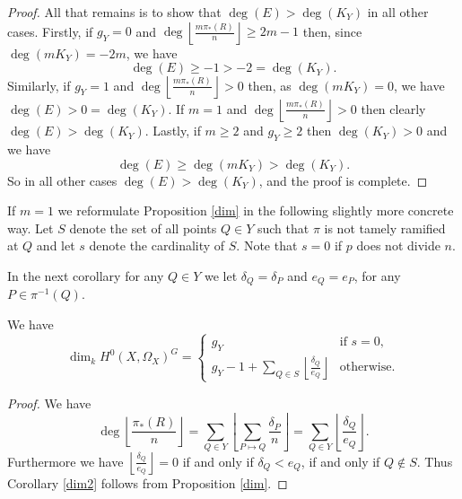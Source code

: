 \begin{proof}
    
    All that remains is to show that $\deg(E)>\deg(K_Y)$ in all other cases.
    Firstly, if $g_Y=0$ and $\deg \left\lfloor\frac{m\pi_*(R)}{n} \right\rfloor \geq 2m-1$ then, since $\deg(mK_Y)=-2m$, we have 
        \[
        \deg \left( E \right) \geq -1 >-2 = \deg(K_Y).
        \]
    Similarly, if $g_Y=1$ and $\deg \left\lfloor\frac{m\pi_*(R)}{n} \right\rfloor >0$ then, as $\deg \left( mK_Y \right)=0$, we have $\deg \left( E \right) > 0 = \deg (K_Y)$.
    If $m=1$ and $\deg \left\lfloor\frac{m\pi_*(R)}{n} \right\rfloor >0$ then clearly $\deg \left( E \right) > \deg (K_Y)$.
    Lastly, if $m\geq 2$ and $g_Y\geq 2$ then $\deg (K_Y) > 0$ and we have 
        \begin{equation*}
        \deg \left( E \right) \geq \deg\left( mK_Y \right) > \deg (K_Y).
        \end{equation*}
    So in all other cases $\deg(E)>\deg(K_Y)$, and the proof is complete.
    \end{proof}


If $m=1$ we reformulate Proposition \ref{dim} in the following slightly more concrete way. 
Let $S$ denote the set of all points $Q\in Y$ such that $\pi$ is not tamely ramified at $Q$ and let $s$ denote the cardinality of $S$. 
Note that $s=0$ if $p$ does not divide $n$.


In the next corollary for any $Q \in Y$ we let $\delta_Q = \delta_P$ and $e_Q = e_P$, for any $P \in \pi^{-1}(Q)$.


    \begin{cor}\label{dim2}
    We have 
        \begin{equation*}
        \dim_kH^0(X,\Omega_X)^G = 
            \begin{cases}
            g_Y & \mbox{if } s=0, \\
            g_Y-1+\sum_{Q\in S}\left\lfloor \frac{\delta_Q}{e_Q} \right\rfloor & \mbox{otherwise}.
            \end{cases}
        \end{equation*}
    \end{cor}
    \begin{proof}
    We have
        \[
        \deg\left\lfloor\frac{\pi_*(R)}{n} \right\rfloor = \sum_{Q\in Y}\left\lfloor\sum_{P\mapsto Q} \frac{\delta_P}{n} \right\rfloor = \sum_{Q\in Y} \left\lfloor \frac{\delta_Q}{e_Q} \right\rfloor.
        \]
    Furthermore we have $\left\lfloor \frac{\delta_Q}{e_Q} \right\rfloor = 0$ if and only if $\delta_Q<e_Q$, \ie if and only if $Q\notin S$. 
    Thus Corollary \ref{dim2} follows from Proposition \ref{dim}.
    \end{proof}

